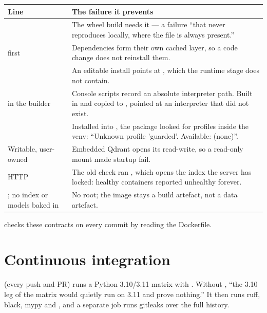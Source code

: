 \begin{center}\small
\begin{tabularx}{\textwidth}{@{}>{\raggedright\arraybackslash}p{4.4cm}L@{}}
\toprule
\textbf{Line} & \textbf{The failure it prevents}\\
\midrule
{} & The wheel build needs it --- a failure ``that never reproduces locally, where the file is always present.''\\
 first & Dependencies form their own cached layer, so a code change does not reinstall them.\\
 & An editable install points at , which the runtime stage does not contain.\\
 in the builder & Console scripts record an absolute interpreter path. Built in  and copied to ,  pointed at an interpreter that did not exist.\\
 & Installed into , the package looked for profiles inside the venv: ``Unknown profile 'guarded'. Available: (none)''.\\
Writable, user-owned  & Embedded Qdrant opens its  read-write, so a read-only mount made startup fail.\\
HTTP  & The old check ran , which opens the index the server has locked: healthy containers reported unhealthy forever.\\
; no index or models baked in & No root; the image stays a build artefact, not a data artefact.\\
\bottomrule
\end{tabularx}
\end{center}
 checks these contracts on every commit by reading the Dockerfile.

\section{Continuous integration}

\textbf{} (every push and PR) runs a Python 3.10/3.11 matrix with . Without , ``the 3.10 leg of the matrix would quietly run on 3.11 and prove nothing.'' It then runs ruff, black, mypy and , and a separate job runs gitleaks over the full history.


